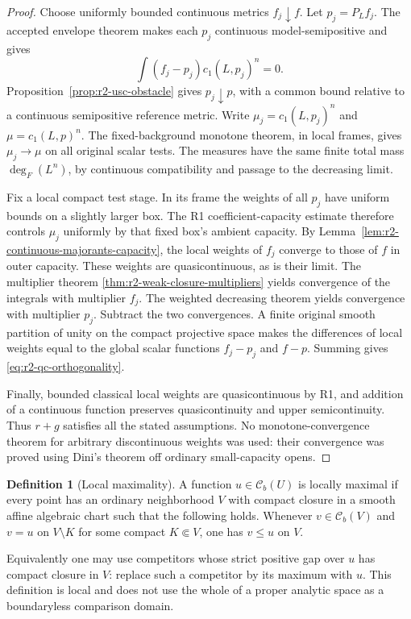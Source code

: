 \documentclass[11pt,a4paper]{article}
\numberwithin{equation}{section}
\theoremstyle{definition}
\newtheorem{definition}[theorem]{Definition}
\theoremstyle{remark}
\newcommand{\Cb}{\mathcal C_b}
\begin{document}
\begin{proof}
Choose uniformly bounded continuous metrics $f_j\downarrow f$.
Let $p_j=P_L f_j$. The accepted envelope theorem makes each
$p_j$ continuous model-semipositive and gives
\[
 \int(f_j-p_j)c_1(L,p_j)^n=0.
\]
Proposition~\ref{prop:r2-usc-obstacle} gives $p_j\downarrow p$,
with a common bound relative to a continuous semipositive
reference metric. Write $\mu_j=c_1(L,p_j)^n$ and
$\mu=c_1(L,p)^n$. The fixed-background monotone theorem, in
local frames, gives $\mu_j\to\mu$ on all original scalar tests.
The measures have the same finite total mass $\deg_F(L^n)$,
by continuous compatibility and passage to the decreasing limit.

Fix a local compact test stage. In its frame the weights of all
$p_j$ have uniform bounds on a slightly larger box. The R1
coefficient-capacity estimate therefore controls $\mu_j$
uniformly by that fixed box's ambient capacity. By
Lemma~\ref{lem:r2-continuous-majorants-capacity}, the local weights
of $f_j$ converge to those of $f$ in outer capacity. These weights
are quasicontinuous, as is their limit. The multiplier theorem
\ref{thm:r2-weak-closure-multipliers} yields convergence of the
integrals with multiplier $f_j$. The weighted decreasing theorem
yields convergence with multiplier $p_j$. Subtract the two
convergences. A finite original smooth partition of unity on the
compact projective space makes the differences of local weights
equal to the global scalar functions $f_j-p_j$ and $f-p$.
Summing gives \eqref{eq:r2-qc-orthogonality}.

Finally, bounded classical local weights are quasicontinuous by
R1, and addition of a continuous function preserves
quasicontinuity and upper semicontinuity. Thus $r+g$ satisfies all
the stated assumptions. No monotone-convergence theorem for
arbitrary discontinuous weights was used: their convergence was
proved using Dini's theorem off ordinary small-capacity opens.
\end{proof}

\begin{definition}[Local maximality]
\label{def:r2-maximality}
A function $u\in\Cb(U)$ is locally maximal if every point has
an ordinary neighborhood $V$ with compact closure in a smooth
affine algebraic chart such that the following holds. Whenever
$v\in\Cb(V)$ and $v=u$ on $V\setminus K$ for some compact
$K\Subset V$, one has $v\leq u$ on $V$.

Equivalently one may use competitors whose strict positive gap
over $u$ has compact closure in $V$: replace such a competitor
by its maximum with $u$. This definition is local and does not
use the whole of a proper analytic space as a boundaryless
comparison domain.
\end{definition}
\end{document}
